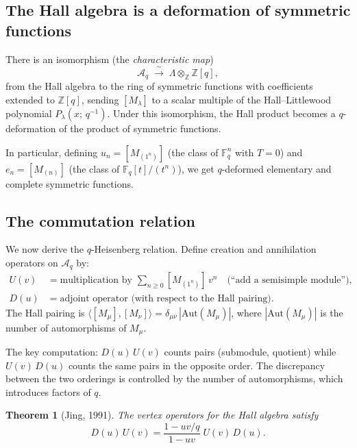 \documentclass[12pt,a4paper]{article}
\newtheorem{theorem}{Theorem}[section]
\theoremstyle{definition}
\theoremstyle{remark}
\newcommand{\Z}{\mathbb{Z}}
\newcommand{\F}{\mathbb{F}}
\begin{document}
\subsection{The Hall algebra is a deformation of symmetric functions}

There is an isomorphism (the \emph{characteristic map})
\[
  \mathcal{A}_q \;\xrightarrow{\;\sim\;}\; \Lambda \otimes_\Z
  \Z[q],
\]
from the Hall algebra to the ring of symmetric functions with
coefficients extended to $\Z[q]$, sending $[M_\lambda]$ to a
scalar multiple of the Hall--Littlewood polynomial
$P_\lambda(x;\, q^{-1})$. Under this isomorphism, the Hall product
becomes a $q$-deformation of the product of symmetric functions.

In particular, defining $u_n = [M_{(1^n)}]$ (the class of
$\F_q^n$ with $T = 0$) and $e_n = [M_{(n)}]$ (the class of
$\F_q[t]/(t^n)$), we get $q$-deformed elementary and complete
symmetric functions.

\subsection{The commutation relation}

We now derive the $q$-Heisenberg relation. Define creation and
annihilation operators on $\mathcal{A}_q$ by:
\begin{align*}
  U(v) &= \text{multiplication by } \sum_{n \geqslant 0} [M_{(1^n)}]\, v^n
  \quad\text{(``add a semisimple module'')}, \\
  D(u) &= \text{adjoint operator (with respect to the Hall pairing)}.
\end{align*}
The Hall pairing is $\langle [M_\mu], [M_\nu] \rangle =
\delta_{\mu\nu}\, |\mathrm{Aut}(M_\mu)|$, where $|\mathrm{Aut}(M_\mu)|$
is the number of automorphisms of $M_\mu$.

The key computation: $D(u)\, U(v)$ counts pairs (submodule, quotient)
while $U(v)\, D(u)$ counts the same pairs in the opposite order. The
discrepancy between the two orderings is controlled by the number of
automorphisms, which introduces factors of $q$.

\begin{theorem}[Jing, 1991]\label{thm:HL-comm}
The vertex operators for the Hall algebra satisfy
\begin{equation}\label{eq:HL-comm}
  D(u)\, U(v) = \frac{1-uv/q}{1-uv}\; U(v)\, D(u).
\end{equation}
\end{theorem}
\end{document}
